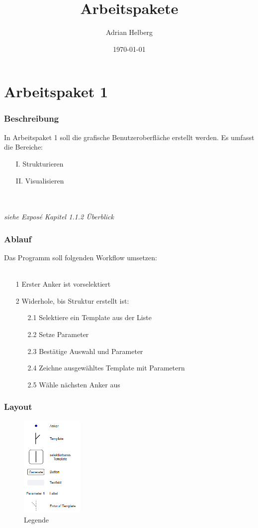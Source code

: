 \documentclass[12pt]{beamer}
\title{Arbeitspakete}
\author{Adrian Helberg}
\date{\today}
\begin{document}
    \maketitle

    \section{Arbeitspaket 1}
    \begin{frame}
        \frametitle{Beschreibung}
        In Arbeitspaket 1 soll die grafische Benutzeroberfläche erstellt werden. Es umfasst die
        Bereiche:
        \begin{itemize}
            \item[I.] Strukturieren
            \item[II.] Visualisieren
        \end{itemize}
        \\~\\
        \textit{siehe Exposé Kapitel 1.1.2 Überblick}
    \end{frame}

    \begin{frame}[fragile]
        \frametitle{Ablauf}
        Das Programm soll folgenden Workflow umsetzen:\\~\\
        \begin{itemize}
            \item[1] Erster Anker ist vorselektiert
            \item[2] Widerhole, bis Struktur erstellt ist:
            \begin{itemize}
                \item[2.1] Selektiere ein Template aus der Liste
                \item[2.2] Setze Parameter
                \item[2.3] Bestätige Auswahl und Parameter
                \item[2.4] Zeichne ausgewähltes Template mit Parametern
                \item[2.5] Wähle nächsten Anker aus
            \end{itemize}
        \end{itemize}
    \end{frame}

    \begin{frame}
        \frametitle{Layout}
        \begin{figure}
            \centering
            \includegraphics[width=3cm]{../images/UI_Legende.PNG}
            \caption{Legende}
        \end{figure}
    \end{frame}
\end{document}
